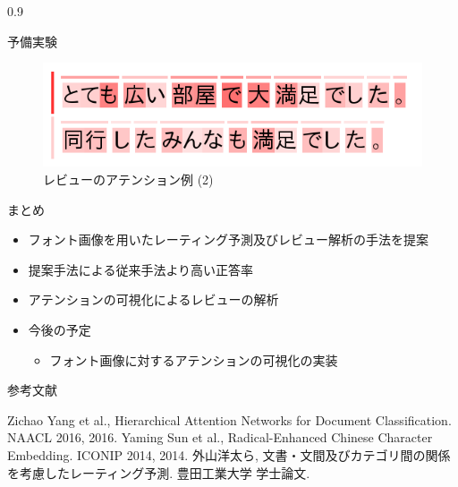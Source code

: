 \documentclass[unicode,10pt]{beamer}
\newlength{\mycolumnwidth}
\newcommand{\itemtitle}[1]{#1\\}
\begin{document}
\begin{frame}[t]
\begin{columns}[onlytextwidth,t]
\begin{column}{0.9\mycolumnwidth}
\begin{block}{予備実験}
      \begin{figure}
        \centering
        \includegraphics[width=0.8\linewidth]{fig/review_2.png}
        \caption*{レビューのアテンション例 (2)}
      \end{figure}
    \end{block}

    \begin{block}{まとめ}
      \begin{itemize}
        \item フォント画像を用いたレーティング予測及びレビュー解析の手法を提案
        \item 提案手法による従来手法\cite{yang16}より高い正答率
        \item アテンションの可視化によるレビューの解析
        \item \itemtitle{今後の予定}
          \begin{itemize}
            \item フォント画像に対するアテンションの可視化の実装
          \end{itemize}
      \end{itemize}
    \end{block}

    \vspace{2ex} %
    参考文献
    
    \begin{thebibliography}{9}
        Zichao Yang et al.,
        Hierarchical Attention Networks for Document Classification.
        NAACL 2016, 2016.
        Yaming Sun et al.,
        Radical-Enhanced Chinese Character Embedding.
        ICONIP 2014, 2014.
        外山洋太ら,
        文書・文間及びカテゴリ間の関係を考慮したレーティング予測.
        豊田工業大学 学士論文.
    \end{thebibliography}
  \end{column}
\end{columns}

\end{frame}
\end{document}
